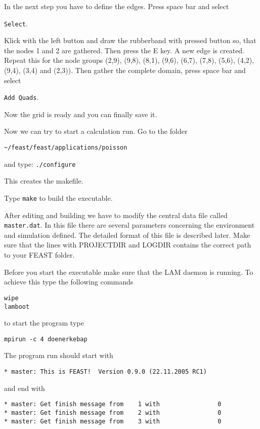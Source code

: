 In the next step you have to define the edges. Press space bar and select 

\verb+Select+.


Klick with the left button and draw
the rubberband with pressed button so, that the nodes 1 and 2 are gathered. Then
press the E key. A new edge is created. Repeat this for the node groups
(2,9), (9,8), (8,1), (9,6), (6,7), (7,8), (5,6), (4,2), (9,4), (3,4) and (2,3)).
Then gather the complete domain, press space bar and select 

\verb+Add Quads+.

Now the grid is ready and you can finally save it.

Now we can try to start a calculation run. Go to the folder 

\verb+~/feast/feast/applications/poisson+ 

and type: \verb+./configure+

This creates the makefile.

Type \verb+make+ to build the executable.

After editing and building we have to modify the central data file
called \verb+master.dat+. In this file there are several parameters concerning
the environment and simulation defined. The detailed format of this file
is described later. Make sure that the lines with PROJECTDIR and LOGDIR
contains the correct path to your FEAST folder.
 
Before you start the executable make sure that the LAM daemon is
running. To achieve this type the following commands

\begin{verbatim}
wipe
lamboot
\end{verbatim}

to start the program type

\begin{verbatim}
mpirun -c 4 doenerkebap
\end{verbatim}


The program run should start with 

\begin{verbatim}
* master: This is FEAST!  Version 0.9.0 (22.11.2005 RC1)
\end{verbatim}

and end with 

\begin{verbatim}
* master: Get finish message from    1 with                0
* master: Get finish message from    2 with                0
* master: Get finish message from    3 with                0
\end{verbatim}


